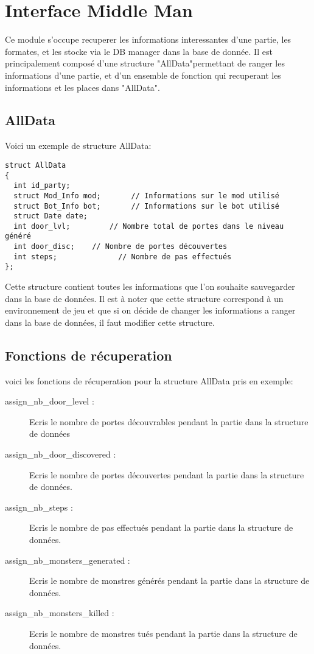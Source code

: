 \section{Interface Middle Man} 

Ce module s'occupe recuperer les informations interessantes d'une partie, les formates, et les stocke via le DB manager dans la base de donnée.
Il est principalement composé d'une structure "AllData"permettant de ranger les informations d'une partie, et d'un ensemble de fonction
qui recuperant les informations et les places dans "AllData".

\subsection{AllData}

Voici un exemple de structure AllData:

\begin{verbatim}
struct AllData
{
  int id_party;
  struct Mod_Info mod;       // Informations sur le mod utilisé
  struct Bot_Info bot;       // Informations sur le bot utilisé
  struct Date date;
  int door_lvl;         // Nombre total de portes dans le niveau généré
  int door_disc;    // Nombre de portes découvertes
  int steps;              // Nombre de pas effectués
};
\end{verbatim}
Cette structure contient toutes les informations que l'on souhaite sauvegarder dans la base de données. Il est à noter que cette structure correspond à un environnement de jeu et que si on décide de changer les informations a ranger dans la base de données, il faut modifier cette structure.
 
\subsection{Fonctions de récuperation}

voici les fonctions de récuperation pour la structure AllData pris en exemple: 

\begin{description}
\item[assign\_nb\_door\_level :] Ecris le nombre de portes découvrables pendant la partie dans la structure de données

\item[assign\_nb\_door\_discovered :] Ecris le nombre de portes découvertes pendant la partie dans la structure de données. 

\item[assign\_nb\_steps :] Ecris le nombre de pas effectués pendant la partie dans la structure de données.

\item[assign\_nb\_monsters\_generated :] Ecris le nombre de monstres générés pendant la partie dans la structure de données.

\item[assign\_nb\_monsters\_killed :] Ecris le nombre de monstres tués pendant la partie dans la structure de données.
\end{description}
